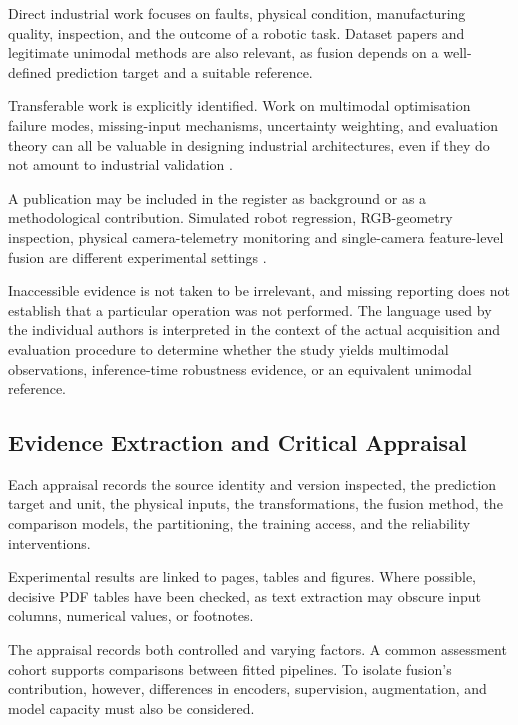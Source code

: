 Direct industrial work focuses on faults, physical condition, manufacturing quality, inspection, and
the outcome of a robotic task. Dataset papers and legitimate unimodal methods are also relevant, as
fusion depends on a well-defined prediction target and a suitable reference.

Transferable work is explicitly identified. Work on multimodal optimisation failure modes,
missing-input mechanisms, uncertainty weighting, and evaluation theory can all be valuable in
designing industrial architectures, even if they do not amount to industrial validation
\parencite{Wang2020What,P016,P023,Bengio2004CVVariance}.

A publication may be included in the register as background or as a methodological contribution.
Simulated robot regression, RGB-geometry inspection, physical camera-telemetry monitoring and
single-camera feature-level fusion are different experimental settings
\parencite{Altinses2023Fuzzy,P026,Thoduka2024Handover,P035}.

Inaccessible evidence is not taken to be irrelevant, and missing reporting does not establish that a
particular operation was not performed. The language used by the individual authors is interpreted
in the context of the actual acquisition and evaluation procedure to determine whether the study
yields multimodal observations, inference-time robustness evidence, or an equivalent unimodal
reference.

\subsection{Evidence Extraction and Critical Appraisal}

Each appraisal records the source identity and version inspected, the prediction target and unit,
the physical inputs, the transformations, the fusion method, the comparison models, the
partitioning, the training access, and the reliability interventions.

Experimental results are linked to pages, tables and figures. Where possible, decisive PDF tables
have been checked, as text extraction may obscure input columns, numerical values, or footnotes.

The appraisal records both controlled and varying factors. A common assessment cohort supports
comparisons between fitted pipelines. To isolate fusion's contribution, however, differences in
encoders, supervision, augmentation, and model capacity must also be considered.


